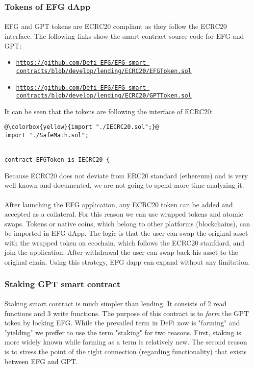 \documentclass{article}
\begin{document}
\subsubsection{Tokens of EFG dApp}
\paragraph{ }
EFG and GPT tokens are ECRC20 compliant as they follow the ECRC20 interface. The following links show the smart contract source code for EFG and GPT:
\begin{itemize}
\item \texttt{\url{https://github.com/Defi-EFG/EFG-smart-contracts/blob/develop/lending/ECRC20/EFGToken.sol}}
\item \texttt{\url{https://github.com/Defi-EFG/EFG-smart-contracts/blob/develop/lending/ECRC20/GPTToken.sol}}
\end{itemize}
It can be seen that the tokens are following the interface of ECRC20:
\begin{lstlisting}[language=Solidity,firstnumber=7,escapechar=@]
@\colorbox{yellow}{import "./IECRC20.sol";}@
import "./SafeMath.sol";


contract EFGToken is IECRC20 {
\end{lstlisting}
Because ECRC20 does not deviate from ERC20 standard (ethereum) and is very well known and documented, we are not going to spend more time analyzing it.
\paragraph{ }
After launching the EFG application, any ECRC20 token can be added and accepted as a collateral. For this reason we can use wrapped tokens and atomic swaps. Tokens or native coins, which belong to other platforms (blockchains), can be imported in EFG dApp. The logic is that the user can swap the original asset with the wrapped token on ecochain, which follows the ECRC20 stanfdard, and join the application. After withdrawal the user can swap back his asset to the original chain. Using this strategy, EFG dapp can expand without any limitation.

\subsubsection{Staking GPT smart contract}
\paragraph{ }
Staking smart contract is much simpler than lending. It consists of 2 read functions and 3 write functions. The purpose of this contract is to \emph{farm} the GPT token by locking EFG. While the prevailed term in DeFi now is "farming" and "yielding" we preffer to use the term "staking" for two reasons. First, staking is more widely known while farming as a term is relatively new. The second reason is to stress the point of the tight connection (regarding functionality) that exists between EFG and GPT.
\end{document}
